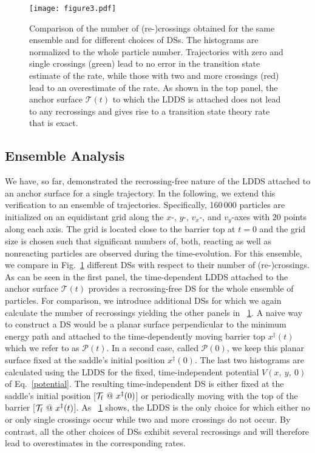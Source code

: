 \documentclass{elsarticle}
\def\EDITS#1{{\color{green}#1}}
\def\EDITS#1{#1}
\def\EDITS#1{{\color{mygreen}#1}}
\begin{document}
\begin{figure}[t]
% 
\texttt{[image: figure3.pdf]}
\caption{%
Comparison of the number of (re-)crossings obtained for the same ensemble
and for different choices of DSs.
The histograms are normalized to the whole particle number.
Trajectories with 
zero and single crossings (green) 
lead to no error in the transition state estimate of the rate,
while those with two 
and more crossings (red) lead to an overestimate of the rate.
As shown in the top panel, 
\EDITS{the anchor surface}
$\mathcal{T}(t)$ 
\EDITS{to which the LDDS is attached}
does not lead to any recrossings
and gives rise to a transition state theory rate that is exact.
}
\label{fig:hists}
\end{figure}
\subsection{Ensemble Analysis}

We have, so far, demonstrated the recrossing-free nature of the LDDS 
\EDITS{attached to an anchor surface} for a 
single trajectory.
In the following, we extend this verification to an ensemble of trajectories.
Specifically, 160\,000 particles are initialized 
on an equidistant grid along the $x$-, $y$-, $v_x$-, and $v_y$-axes with 20 
points along each axis.
The grid is located close to the barrier top at $t=0$ and the grid size is 
chosen such that significant numbers of, both, reacting as well as nonreacting 
particles are observed during the time-evolution.
% 
For this ensemble, we compare in Fig.~\ref{fig:hists} different DSs with 
respect 
to their number of (re-)crossings. As can be seen in the first panel,
the time-dependent LDDS 
\EDITS{attached to the anchor surface}
$\mathcal{T}(t)$ 
provides a recrossing-free DS 
for the whole ensemble of particles. 
For comparison, we introduce additional
DSs for which we again calculate the number 
of recrossings yielding the other panels in \FIG~\ref{fig:hists}.
A naive way to construct a DS would be a planar surface perpendicular 
to the minimum energy path and attached to the time-dependently moving
barrier top $x^\ddagger(t)$ which we refer to as $\mathcal{P}(t)$. 
In a second case, called $\mathcal{P}(0)$, we keep this planar surface fixed at
the saddle's initial position $x^\ddagger(0)$. The last two histograms are
calculated using the LDDS 
for the fixed, time-independent 
potential 
$V(x,~y,~0)$ of Eq.~\eqref{potential}. The resulting time-independent DS
is either fixed at the saddle's initial position 
[$\mathcal{T}_\mathrm{f}~@~x^\ddagger(0)$]
or periodically moving with the top of the barrier 
[$\mathcal{T}_\mathrm{f}~@~x^\ddagger(t)$].
% 
% 
As \FIG~\ref{fig:hists} shows, the LDDS is the only choice for which either no 
or only single crossings occur while two and more crossings do not occur.
By contrast, all the other choices of DSs exhibit several recrossings 
and will therefore lead to overestimates in the corresponding rates.
\end{document}
